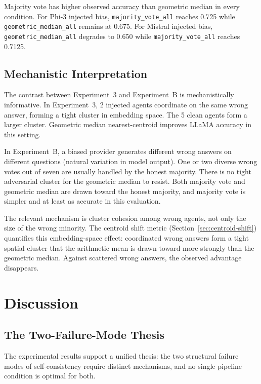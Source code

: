 \documentclass[11pt]{article}
\begin{document}
Majority vote has higher observed accuracy than geometric median in every
condition. For Phi-3 injected bias, \texttt{majority\_vote\_all} reaches 0.725
while \texttt{geometric\_median\_all} remains at 0.675. For Mistral injected
bias, \texttt{geometric\_median\_all} degrades to 0.650 while
\texttt{majority\_vote\_all} reaches 0.7125.

\subsection{Mechanistic Interpretation}
\label{sec:multi-interp}

The contrast between Experiment~3 and Experiment~B is mechanistically
informative. In Experiment~3, 2 injected agents coordinate on the same wrong
answer, forming a tight cluster in embedding space. The 5 clean agents form a
larger cluster. Geometric median nearest-centroid improves LLaMA accuracy in
this setting.

In Experiment~B, a biased provider generates different wrong answers on different
questions (natural variation in model output). One or two diverse wrong votes
out of seven are usually handled by the honest majority. There is no tight
adversarial cluster for the geometric median to resist. Both majority vote and
geometric median are drawn toward the honest majority, and majority vote is
simpler and at least as accurate in this evaluation.

The relevant mechanism is cluster cohesion among wrong agents, not only the size
of the wrong minority. The centroid shift metric (Section~\ref{sec:centroid-shift})
quantifies this embedding-space effect: coordinated wrong answers form a tight
spatial cluster that the arithmetic mean is drawn toward more strongly than the
geometric median. Against scattered wrong answers, the observed advantage
disappears.

\section{Discussion}
\label{sec:discussion}

\subsection{The Two-Failure-Mode Thesis}
\label{sec:thesis}

The experimental results support a unified thesis: the two structural failure
modes of self-consistency require distinct mechanisms, and no single pipeline
condition is optimal for both.
\end{document}
